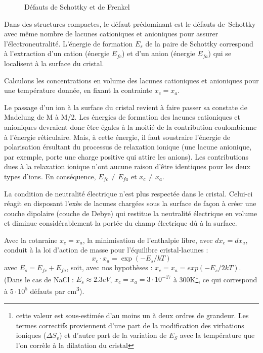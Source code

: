 \begin{figure}
    \TODO
    \caption{Défauts de Schottky et de Frenkel}
    \label{schottkyfrenkel}
\end{figure}

Dans des structures compactes, le défaut prédominant est le défauts de Schottky
avec même nombre de lacunes cationiques et anioniques pour assurer
l'électroneutralité. L'énergie de formation $E_s$ de la paire de Schottky
correspond à l'extraction d'un cation (énergie $E_{fc}$) et d'un anion (énergie
$E_{fa}$) qui se localisent à la surface du cristal.

Calculons les concentrations en volume des lacunes cationiques et anioniques pour
une température donnée, en fixant la contrainte $x_c = x_a$.

Le passage d'un ion à la surface du cristal revient à faire passer sa constate de
Madelung de M à M/2. Les énergies de formation des lacunes cationiques et
anioniques devraient donc être égales à la moitié de la contribution coulombienne
à l'énergie réticulaire. Mais, à cette énergie, il faut soustraire l'énergie de
polarisation érsultant du processus de relaxation ionique (une lacune anionique,
par exemple, porte une charge positive qui attire les anions). Les contributions
dues à la relaxation ionique n'ont aucune raison d'être identiques pour les deux
types d'ions. En conséquence, $E_{fc} \neq E_{fa}$ et $x_c \neq x_a$.

La condition de neutralité électrique n'est plus respectée dans le cristal.
Celui-ci réagit en disposant l'exès de lacunes chargées sous la surface de façon
à créer une couche dipolaire (couche de Debye) qui restitue la neutralité
électrique en volume et diminue considérablement la portée du champ électrique dû
à la surface.

Avec la cotnraine $x_c = x_a$, la minimisation de l'enthalpie libre, avec $dx_c =
dx_a$, conduit à la loi d'action de masse pour l'équilibre cristal-lacunes :
\begin{equation}
    x_c \cdot x_a = \exp(-E_s/kT)
\end{equation}
avec $E_s = E_{fc} + E_{fa}$, soit, avec nos hypothèses : 
$x_c = x_a = exp(-E_s/2kT)$.
(Dans le cas de NaCl : $E_s \approx 2.3 eV$, $x_c = x_a = 3\cdot 10^{-17}$ à
300K\footnote{cette valeur est sous-estimée d'au moins un à deux ordres de
grandeur. Les termes correctifs proviennent d'une part de la modification des
virbations ioniques ($\Delta S_v$) et d'autre part de la variation de $E_S$ avec
la température que l'on corrèle à la dilatation du cristal}, ce qui correspond à
$5\cdot10^5$ défauts par \si{\cubic\centi\metre}).

